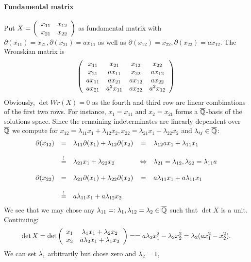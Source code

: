 \paragraph{Fundamental matrix} Put $X = \left(\bao{cc}
x_{11} & x_{12}\\
x_{21} & x_{22}\\
\ea\right)$ as fundamental matrix with $\partial(x_{11}) = x_{21}, \partial(x_{21}) = a x_{11}$ as well as $\partial(x_{12}) = x_{22}, \partial(x_{22}) = a x_{12}$. The Wronskian matrix is
{\scriptsize
$$\left(\bao{cccc}
x_{11} & x_{21} & x_{12} & x_{22}\\
x_{21} & a x_{11} & x_{22} & a x_{12}\\
a x_{11} &  a x_{21} & a x_{12} & a x_{22}\\
a x_{21} & a^2 x_{11} & a x_{22} & a^2 x_{12}\\
\ea\right)
$$}
Obviously, $\det Wr(X) = 0$ as the fourth and third row are linear combinations of the first two rows. For instance, $x_1 = x_{11}$ and $x_2 = x_{21}$ forms a $\currfield$-basis of the solutions space. Since the remaining indeterminates are linearly dependent over $\currfield$ we compute for $x_{12} = \lambda_{11} x_1 + \lambda_{12} x_2, x_{22} = \lambda_{21} x_1 + \lambda_{22} x_2$ and $\lambda_{ij} \in \currfield$:
$$\bao{rclcl}
\partial(x_{12}) &=& \lambda_{11} \partial(x_1) + \lambda_{12} \partial(x_2) &=& \lambda_{12} a x_1 + \lambda_{11} x_1\\ 
&&&&\\
&\stackrel{!}{=}& \lambda_{21} x_1 + \lambda_{22} x_2 &\LRA& \lambda_{21} = \lambda_{12}, \lambda_{22} = \lambda_{11} a\\
&&&&\\
\partial(x_{22}) &=& \lambda_{21} \partial(x_1) + \lambda_{22} \partial(x_2) &=& a \lambda_{11} x_1 + a \lambda_{11} x_1\\
&&&&\\
&\stackrel{!}{=}& a \lambda_{11} x_1 + a\lambda_{12} x_2\\
\ea$$
We see that we may chose any $\lambda_{11} =: \lambda_1, \lambda_{12} = \lambda_2 \in \currfield$ such that $\det X$ is a unit. Continuing:
$$\det X = \det \left(
\bao{cc}
x_1 & \lambda_1 x_1 + \lambda_2 x_2\\
x_2 & a \lambda_2 x_1 + \lambda_1 x_2\\
\ea\right) = %
= a \lambda_2 x_1^2 - \lambda_2 x_2^2 = \lambda_2 (a x_1^2 - x_2^2).$$
We can set $\lambda_1$ arbitrarily but chose zero and $\lambda_2 = 1$,
